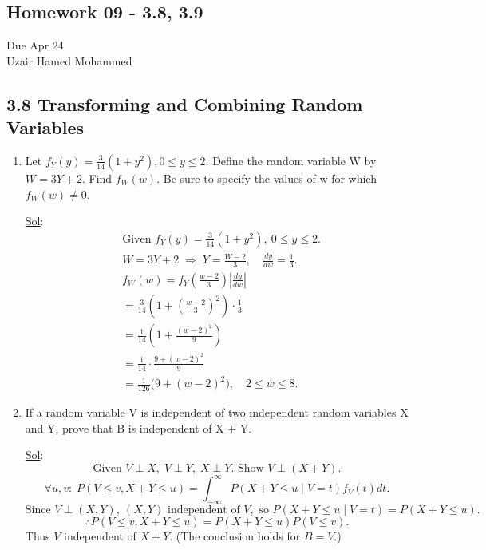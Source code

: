 \begin{center}
	\section*{Homework 09 - 3.8, 3.9}
	Due Apr 24 \\
	Uzair Hamed Mohammed
\end{center}


\subsection*{3.8 Transforming and Combining Random Variables}

\begin{enumerate}
	\item[2.] Let \(f_Y(y) = \frac{3}{14} (1 + y^2), 0 \leq y \leq 2\). Define the random variable W by \(W = 3Y + 2\). Find \(f_W(w)\). Be sure to specify the values of w for which \(f_W(w) \ne 0\).

	      \underline{Sol}: \\
	      \[
		      \begin{aligned}
			       & \textrm{Given } f_Y(y) = \frac{3}{14}(1+y^2),\ 0\leq y\leq 2.                 \\
			       & W = 3Y+2 \;\Longrightarrow\; Y = \frac{W-2}{3},\quad \frac{dy}{dw} = \frac13. \\
			       & f_W(w) = f_Y\!\left(\frac{w-2}{3}\right)\left|\frac{dy}{dw}\right|            \\
			       & = \frac{3}{14}\left(1+\left(\frac{w-2}{3}\right)^2\right)\cdot\frac13         \\
			       & = \frac{1}{14}\left(1+\frac{(w-2)^2}{9}\right)                                \\
			       & = \frac{1}{14}\cdot\frac{9+(w-2)^2}{9}                                        \\
			       & = \frac{1}{126}\bigl(9+(w-2)^2\bigr),\quad 2\leq w\leq 8.
		      \end{aligned}
	      \]

	\item[6.] If a random variable V is independent of two independent random variables X and Y, prove that B is independent of X + Y.

	      \underline{Sol}: \\
	      \[
		      \text{Given } V \perp X,\; V \perp Y,\; X \perp Y. \text{ Show } V \perp (X+Y).
	      \]
	      \[
		      \forall u,v:\; P(V \leq v, X+Y \leq u) = \int_{-\infty}^{\infty} P(X+Y \leq u \mid V=t) f_V(t) dt.
	      \]
	      \[
		      \text{Since } V \perp (X,Y),\ (X,Y) \text{ independent of } V, \text{ so } P(X+Y \leq u \mid V=t)=P(X+Y \leq u).
	      \]
	      \[
		      \therefore P(V \leq v, X+Y \leq u)=P(X+Y \leq u) P(V \leq v).
	      \]
	      Thus \(V\) independent of \(X+Y\). (The conclusion holds for \(B=V\).)


\end{enumerate}
